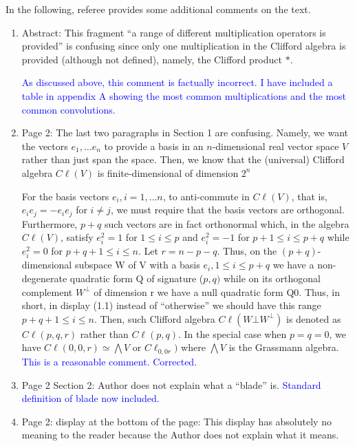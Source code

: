 \documentclass{article}
\newcommand{\cliff}[1]{\ensuremath{C\ell\left(#1\right)}}
\begin{document}
In the following, referee provides some additional comments on the text.

\begin{enumerate}
  \item Abstract: This fragment “a range of different multiplication operators is provided” is confusing since only one multiplication in the Clifford algebra is provided (although not defined),
    namely, the Clifford product $*$.

    \textcolor{blue}{As discussed above, this comment is factually
      incorrect. I have included a table in appendix A showing the
      most common multiplications and the most common convolutions.  }


\item Page 2: The last two paragraphs in Section 1 are confusing.
  Namely, we want the vectors $e_1,\ldots e_n$ to provide a basis in
  an $n$-dimensional real vector space $V$ rather than just span the
  space.  Then, we know that the (universal) Clifford algebra
  \cliff{V} is finite-dimensional of dimension $2^n$

  For the basis vectors $e_i , i = 1, \ldots n$, to anti-commute in
  \cliff{V}, that is, $e_i e_j = -e_i e_j$ for $i\neq j$, we must
  require that the basis vectors are orthogonal.  Furthermore, $p + q$
  such vectors are in fact orthonormal which, in the algebra
  \cliff{V}, satisfy $e_i^2 = 1$ for $1\leq i\leq p$ and $e_i^2 = -1$
  for $p+1\leq i\leq p+q$ while $e_i^2 = 0$ for $p + q + 1 \leq i\leq
  n$.  Let $r=n-p-q$.  Thus, on the $(p + q)$-dimensional subspace W
  of V with a basis $e_i, 1\leq i \leq p+q$ we have a non-degenerate
  quadratic form Q of signature ($p, q)$ while on its orthogonal
  complement $W^\bot$ of dimension r we have a null quadratic form
  Q0. Thus, in short, in display (1.1) instead of “otherwise” we
  should have this range $p + q + 1 \leq i \leq n$.  Then, such
  Clifford algebra \cliff{W\bot W^\bot} is denoted as \cliff{p,q,r}
  rather than \cliff{p,q}. In the special case when $p = q = 0$, we
  have $\cliff{0,0,r}\simeq\bigwedge V$ or $C\ell_{0,0r})$ where
  $\bigwedge V$ is the Grassmann algebra.
  \textcolor{blue}{This is a reasonable comment.  Corrected.}

\item  Page 2 Section 2: Author does not
  explain what a “blade” is.
  \textcolor{blue}{Standard definition of blade now included.}
  \item Page 2: display at the bottom of the
page: This display has absolutely no meaning to the reader because the
Author does not explain what it means.


\end{enumerate}
\end{document}
